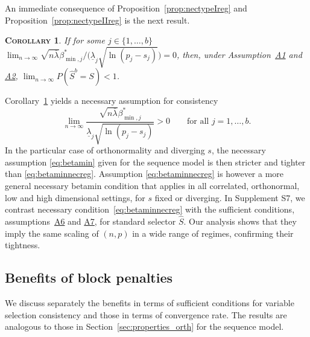 \documentclass[bj,authoryear]{imsart}
\theoremstyle{plain}
\newtheorem{cor}[thm]{\textsc{Corollary}}
\newcommand{\paul}[1]{{\small{\color{green} \sf $\spadesuit$ Paul: #1}}}
\newcommand{\bs}{\boldsymbol}
\begin{document}
An immediate consequence of Proposition~\ref{prop:nectypeIreg} and Proposition~\ref{prop:nectypeIIreg} is the next result.
\begin{cor}\label{cor:necrecovreg}
    If for some $j\in\{1,\ldots,b\}$   $\lim_{n\to\infty}\sqrt{n\bar{\lambda}}\beta_{\min,j}^*/\big(\underline{\lambda}_j\sqrt{\ln(p_j-s_j)}\big) = 0$, then, under Assumption~\hyperlink{lab:A1}{A1} and \hyperlink{lab:A2}{A2},  $\lim_{n \to \infty} P(\hat{S}^b=S) < 1$.
\end{cor}
Corollary~\ref{cor:necrecovreg} yields a necessary assumption for consistency
\begin{equation}\label{eq:betaminnecreg}
\lim_{n\to\infty}\frac{\sqrt{n\bar{\lambda}}\beta_{\min,j}^*}{\underline{\lambda}_j\sqrt{\ln(p_j-s_j)}} > 0\qquad\mbox{for all }j=1,\ldots,b.
\end{equation}
In the particular case of orthonormality and diverging $s$, the necessary assumption \eqref{eq:betamin} given for the sequence model is then stricter and tighter than \eqref{eq:betaminnecreg}. Assumption \eqref{eq:betaminnecreg} is however a more general necessary betamin condition that applies in all correlated, orthonormal, low and high dimensional settings, for $s$ fixed or diverging. In Supplement S7, we contrast necessary condition~\eqref{eq:betaminnecreg} with the sufficient conditions, assumptions~\hyperlink{lab:A6}{A6} and \hyperlink{lab:A7}{A7}, for standard selector $\hat{S}$. Our analysis shows that they imply the same scaling of $(n,p)$ in a wide range of regimes, confirming their tightness. %

\subsection{Benefits of block penalties}
\label{ssec:regression_gains}

We discuss separately the benefits in terms of sufficient conditions for variable selection consistency and those in terms of convergence rate. The results are analogous to those in Section~\ref{sec:properties_orth} for the sequence model. %
\end{document}
